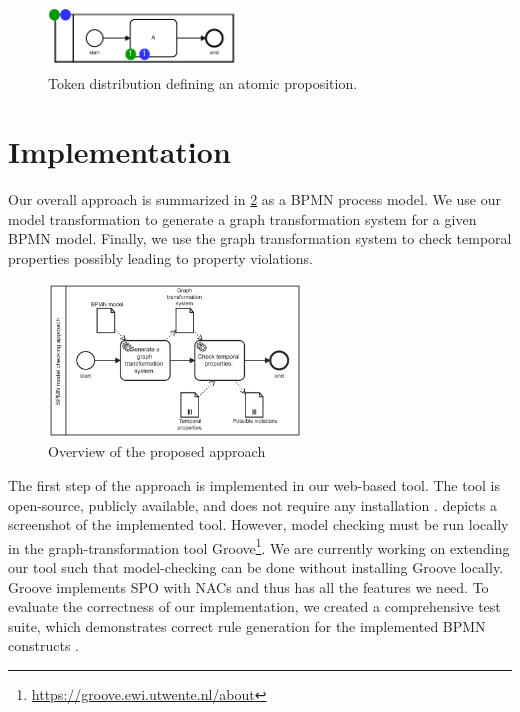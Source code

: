 \documentclass[submission, copyright, creativecommons]{eptcs}
\begin{document}
\begin{figure}[h]
    \centering
    \includegraphics[width=0.45\textwidth]{images/bpmn_semantics-atomic-proposition.pdf}
    \caption{Token distribution defining an atomic proposition.}
    \label{fig:atomicProposition}
\end{figure}






\section{Implementation} \label{sec:impl}
Our overall approach is summarized in \cref{fig:approach} as a BPMN process model.
We use our model transformation to generate a graph transformation system for a given BPMN model.
Finally, we use the graph transformation system to check temporal properties possibly leading to property violations.

\begin{figure}[h!]
    \centering
    \includegraphics[width=0.6\textwidth]{images/full-approach.pdf}
    \caption{Overview of the proposed approach}
    \label{fig:approach}
\end{figure}

The first step of the approach is implemented in our web-based tool.
The tool is open-source, publicly available, and does not require any installation \cite{timkrauterArtifactsTERMGRAPH2022}.
 depicts a screenshot of the implemented tool.
However, model checking must be run locally in the graph-transformation tool Groove\footnote{\url{https://groove.ewi.utwente.nl/about}}.
We are currently working on extending our tool such that model-checking can be done without installing Groove locally.
Groove implements SPO with NACs and thus has all the features we need.
To evaluate the correctness of our implementation, we created a comprehensive test suite, which demonstrates correct rule generation for the implemented BPMN constructs \cite{timkrauterArtifactsTERMGRAPH2022}.
\end{document}
